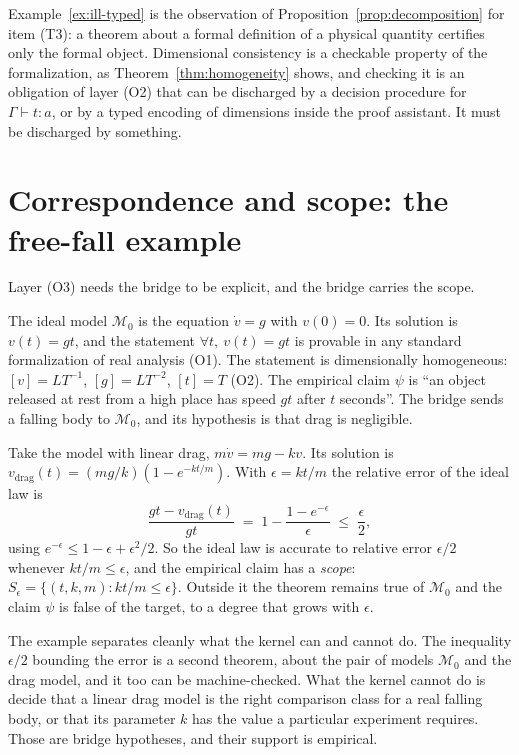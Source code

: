 \begin{remark}
\label{rem:dimensional-tcb}
Example~\ref{ex:ill-typed} is the observation of Proposition~\ref{prop:decomposition} for item (T3): a theorem about a formal definition of a physical quantity certifies only the formal object. Dimensional consistency is a checkable property of the formalization, as Theorem~\ref{thm:homogeneity} shows, and checking it is an obligation of layer (O2) that can be discharged by a decision procedure for $\Gamma\vdash t:a$, or by a typed encoding of dimensions inside the proof assistant. It must be discharged by something.
\end{remark}

\section{Correspondence and scope: the free-fall example}
\label{sec:freefall}

Layer (O3) needs the bridge to be explicit, and the bridge carries the scope.

\begin{example}
\label{ex:freefall}
The ideal model $\mathcal{M}_0$ is the equation $\dot v=g$ with $v(0)=0$. Its solution is $v(t)=gt$, and the statement $\forall t,\ v(t)=gt$ is provable in any standard formalization of real analysis (O1). The statement is dimensionally homogeneous: $[v]=LT^{-1}$, $[g]=LT^{-2}$, $[t]=T$ (O2). The empirical claim $\psi$ is ``an object released at rest from a high place has speed $gt$ after $t$ seconds''. The bridge sends a falling body to $\mathcal{M}_0$, and its hypothesis is that drag is negligible.

Take the model with linear drag, $m\dot v=mg-kv$. Its solution is $v_{\mathrm{drag}}(t)=(mg/k)(1-e^{-kt/m})$. With $\epsilon=kt/m$ the relative error of the ideal law is
\[
\frac{gt-v_{\mathrm{drag}}(t)}{gt}\;=\;1-\frac{1-e^{-\epsilon}}{\epsilon}\;\le\;\frac{\epsilon}{2},
\]
using $e^{-\epsilon}\le1-\epsilon+\epsilon^2/2$. So the ideal law is accurate to relative error $\epsilon/2$ whenever $kt/m\le\epsilon$, and the empirical claim has a \emph{scope}: $S_\epsilon=\{(t,k,m):kt/m\le\epsilon\}$. Outside it the theorem remains true of $\mathcal{M}_0$ and the claim $\psi$ is false of the target, to a degree that grows with $\epsilon$.
\end{example}

The example separates cleanly what the kernel can and cannot do. The inequality $\epsilon/2$ bounding the error is a second theorem, about the pair of models $\mathcal{M}_0$ and the drag model, and it too can be machine-checked. What the kernel cannot do is decide that a linear drag model is the right comparison class for a real falling body, or that its parameter $k$ has the value a particular experiment requires. Those are bridge hypotheses, and their support is empirical.

